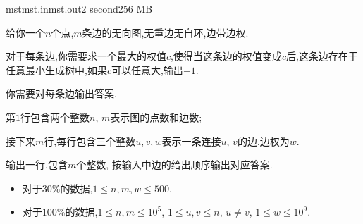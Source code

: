 \documentclass[11pt,a4paper,oneside]{article}
\begin{document}
\begin{problem}{mst}{mst.in}{mst.out}{2 second}{256 MB}

    给你一个$n$个点,$m$条边的无向图,无重边无自环,边带边权.
    
    对于每条边,你需要求一个最大的权值$c$,使得当这条边的权值变成$c$后,这条边存在于任意最小生成树中,如果$c$可以任意大,输出$-1$.
    
    你需要对每条边输出答案.
    
    \InputFile

    第$1$行包含两个整数$n$, $m$表示图的点数和边数;
    
    接下来$m$行,每行包含三个整数$u, v, w$表示一条连接$u$, $v$的边,边权为$w$.

    \OutputFile
    
    输出一行,包含$m$个整数, 按输入中边的给出顺序输出对应答案.

    \Example

    \begin{example}
    \end{example}

	\begin{example}
	\end{example}

    \Note
    \begin{itemize}
        \item 对于$30\%$的数据,$1 \leq n, m, w \leq 500$.
        \item 对于$100\%$的数据,$1 \leq n, m \leq 10^5$, $1 \leq u, v \leq n$, $u \neq v$, $1 \leq w \leq 10^9$.
    \end{itemize}

\end{problem}
\end{document}
